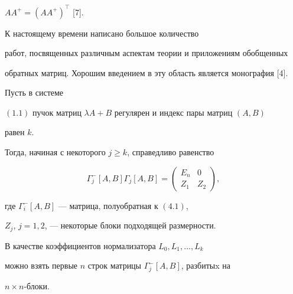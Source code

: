 $AA^{+}=(AA^{+})^{\top }$ [7].





\begin{notes}


К настоящему времени написано большое количество


работ, посвященных различным аспектам теории и приложениям обобщенных


обратных матриц. Хорошим введением в эту область является монография [4].


\end{notes}





\begin{lems}


Пусть в системе


$(1.1)$ пучок матриц $\lambda A+B$ регулярен и индекс пары матриц $(A,B)$


равен $k$.


Тогда, начиная с некоторого $j\geq k$, справедливо равенство


\begin{equation}


\Gamma ^{-}_{j}[A,B]\Gamma _{j}[A,B]=\begin{pmatrix} E_{n} & 0\\


Z_1 & Z_2\end{pmatrix},


\end{equation}


где $\Gamma ^{-}_{i}[A,B]$ --- матрица, полуобратная к $(4.1)$,


$Z_{j}$, $j=1,2$, --- некоторые блоки подходящей размерности.


В качестве коэффициентов нормализатора $L_0, L_1, \dotsc, L_k$


можно взять первые $n$ строк матрицы $\Gamma ^{-}_{j}[A,B]$, разбитыx на


$n\times n$-блоки.


\end{lems}





